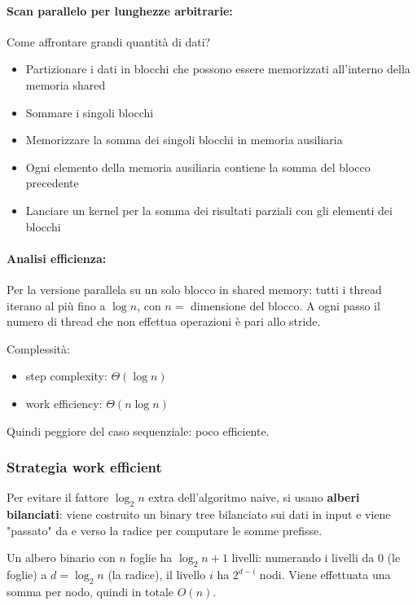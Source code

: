 \paragraph{Scan parallelo per lunghezze arbitrarie:} Come affrontare grandi quantità di dati? 
\begin{itemize}
    \item Partizionare i dati in blocchi che possono essere memorizzati all'interno della memoria shared
    
    \item Sommare i singoli blocchi 
    
    \item Memorizzare la somma dei singoli blocchi in memoria ausiliaria
    
    \item Ogni elemento della memoria ausiliaria contiene la somma del blocco precedente
    
    \item Lanciare un kernel per la somma dei risultati parziali con gli elementi dei blocchi
\end{itemize}

\paragraph{Analisi efficienza:} Per la versione parallela su un solo blocco in shared memory: tutti i thread iterano al più fino a $\log n$, con $n =$ dimensione del blocco. A ogni passo il numero di thread che non effettua operazioni è pari allo stride.

Complessità: 
\begin{itemize}
    \item step complexity: $\Theta (\log n)$
    \item work efficiency: $\Theta (n \log n)$
\end{itemize}

Quindi peggiore del caso sequenziale: poco efficiente.

\subsubsection{Strategia work efficient}

Per evitare il fattore $\log_2 n$ extra dell'algoritmo naive, si usano \textbf{alberi bilanciati}: viene costruito un binary tree bilanciato sui dati in input e viene "passato" da e verso la radice per computare le somme prefisse.

Un albero binario con $n$ foglie ha $\log_2 n + 1$ livelli: numerando i livelli da $0$ (le foglie) a $d = \log_2 n$ (la radice), il livello $i$ ha $2^{d-i}$ nodi. Viene effettuata una somma per nodo, quindi in totale $O(n)$.

